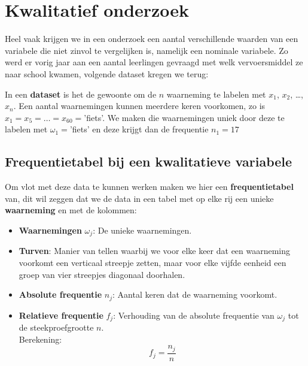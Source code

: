 \documentclass[12pt,twoside,a4paper]{article}
\begin{document}
\cleardoublepage
\section{Kwalitatief onderzoek}

Heel vaak krijgen we in een onderzoek een aantal verschillende waarden van een variabele die niet zinvol te vergelijken is, namelijk een nominale variabele. Zo werd er vorig jaar aan een aantal leerlingen gevraagd met welk vervoersmiddel ze naar school kwamen, volgende dataset kregen we terug:


In een {\bf dataset} is het de gewoonte om de $n$ waarneming te labelen met $x_1$, $x_2$, \ldots, $x_n$. Een aantal waarnemingen kunnen meerdere keren voorkomen, zo is $x_1=x_5=\ldots=x_{60}=$'fiets'. We maken die waarnemingen uniek door deze te labelen met $\omega_1=$'fiets' en deze krijgt dan de frequentie $n_1=17$

\subsection{Frequentietabel bij een kwalitatieve variabele}

Om vlot met deze data te kunnen werken maken we hier een {\bf frequentietabel} van, dit wil zeggen dat we de data in een tabel met op elke rij een unieke {\bf waarneming} en met de kolommen:
\begin{itemize}
  \item {\bf Waarnemingen} $\omega_j$: De unieke waarnemingen.
  \item {\bf Turven}: Manier van tellen waarbij we voor elke keer dat een waarneming voorkomt een verticaal streepje zetten, maar voor elke vijfde eenheid een groep van vier streepjes diagonaal doorhalen.
  \item {\bf Absolute frequentie} $n_j$: Aantal keren dat de waarneming voorkomt.
  \item {\bf Relatieve frequentie} $f_j$: Verhouding van de absolute frequentie van $\omega_j$ tot de steekproefgrootte $n$.\\
  Berekening: $$f_j=\dfrac{n_j}{n}$$
\end{itemize}
\end{document}

